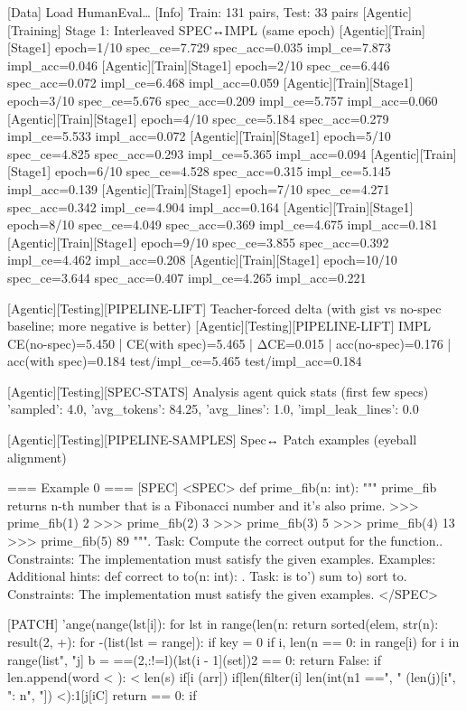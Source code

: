 [Data] Load HumanEval…
[Info] Train: 131 pairs, Test: 33 pairs
[Agentic][Training] Stage 1: Interleaved SPEC↔IMPL (same epoch)
[Agentic][Train][Stage1] epoch=1/10 spec_ce=7.729 spec_acc=0.035 impl_ce=7.873 impl_acc=0.046
[Agentic][Train][Stage1] epoch=2/10 spec_ce=6.446 spec_acc=0.072 impl_ce=6.468 impl_acc=0.059
[Agentic][Train][Stage1] epoch=3/10 spec_ce=5.676 spec_acc=0.209 impl_ce=5.757 impl_acc=0.060
[Agentic][Train][Stage1] epoch=4/10 spec_ce=5.184 spec_acc=0.279 impl_ce=5.533 impl_acc=0.072
[Agentic][Train][Stage1] epoch=5/10 spec_ce=4.825 spec_acc=0.293 impl_ce=5.365 impl_acc=0.094
[Agentic][Train][Stage1] epoch=6/10 spec_ce=4.528 spec_acc=0.315 impl_ce=5.145 impl_acc=0.139
[Agentic][Train][Stage1] epoch=7/10 spec_ce=4.271 spec_acc=0.342 impl_ce=4.904 impl_acc=0.164
[Agentic][Train][Stage1] epoch=8/10 spec_ce=4.049 spec_acc=0.369 impl_ce=4.675 impl_acc=0.181
[Agentic][Train][Stage1] epoch=9/10 spec_ce=3.855 spec_acc=0.392 impl_ce=4.462 impl_acc=0.208
[Agentic][Train][Stage1] epoch=10/10 spec_ce=3.644 spec_acc=0.407 impl_ce=4.265 impl_acc=0.221

[Agentic][Testing][PIPELINE-LIFT] Teacher-forced delta (with gist vs no-spec baseline; more negative is better)
[Agentic][Testing][PIPELINE-LIFT] IMPL CE(no-spec)=5.450 | CE(with spec)=5.465 | ΔCE=0.015 | acc(no-spec)=0.176 | acc(with spec)=0.184
test/impl_ce=5.465 test/impl_acc=0.184

[Agentic][Testing][SPEC-STATS] Analysis agent quick stats (first few specs)
{'sampled': 4.0, 'avg_tokens': 84.25, 'avg_lines': 1.0, 'impl_leak_lines': 0.0}

[Agentic][Testing][PIPELINE-SAMPLES] Spec↔ Patch examples (eyeball alignment)

=== Example 0 ===
[SPEC]
<SPEC> def prime_fib(n: int): """ prime_fib returns n-th number that is a Fibonacci number and it's also prime. >>> prime_fib(1) 2 >>> prime_fib(2) 3 >>> prime_fib(3) 5 >>> prime_fib(4) 13 >>> prime_fib(5) 89 """. Task: Compute the correct output for the function.. Constraints: The implementation must satisfy the given examples. Examples: Additional hints: def correct to to(n: int): . Task: is to') sum to) sort to. Constraints: The implementation must satisfy the given examples. </SPEC>

[PATCH]
'ange(nange(lst[i]): for lst in range(len(n: return sorted(elem, str(n):  result(2, +): for -(list(lst = range]): if key = 0 if i, len(n == 0: in range[i) for i in range(list", "j]  b = ==(2,:!=l)(lst(i - 1](set])2 == 0: return False: if len.append(word < ):  < len(s) if[i (arr]) if[len(filter(i] len(int(n1 ==", " (len(j)[i", ": n", "]) <):1[j[iC] return == 0: if

